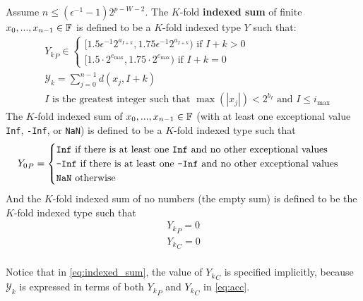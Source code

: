       \begin{samepage}
      \begin{definition}
      Assume $n \leq (\epsilon^{-1} - 1)2^{p - W - 2}$. The $K$-fold \textbf{indexed sum} of finite $x_0, ..., x_{n - 1} \in \mathbb{F}$ is defined to be a $K$-fold indexed type $Y$ such that:
      \begin{equation}
      \begin{aligned}
        &{Y_k}_P \in \begin{cases}[1.5  \epsilon^{-1} 2^{a_{I + k}}, 1.75  \epsilon^{-1} 2^{a_{I + k}}) \text{ if } I + k > 0 \\ [1.5 \cdot 2^{e_{\max}}, 1.75 \cdot 2^{e_{\max}}) \text{ if } I + k = 0\end{cases}\\
        &\mathcal{Y}_k = \sum\limits_{j = 0}^{n - 1}d(x_j, I + k)\\
        & I\text{ is the greatest integer such that }\max(|x_j|) < 2^{b_I} \text{ and } I \leq i_{\max}
      \end{aligned}
      \label{eq:indexed_sum}
      \end{equation}
      The $K$-fold indexed sum of $x_0, ..., x_{n - 1} \in \mathbb{F}$ (with at least one exceptional value \texttt{Inf}, \texttt{-Inf}, or \texttt{NaN}) is defined to be a $K$-fold indexed type such that
      \begin{equation}
        {Y_0}_P = \begin{cases}\texttt{Inf} \text{ if there is at least one \texttt{Inf} and no other exceptional values}\\ \texttt{-Inf} \text{ if there is at least one \texttt{-Inf} and no other exceptional values}\\ \texttt{NaN}\text{ otherwise}\end{cases} \label{eq:indexed_sum_exceptional}
      \end{equation}
      And the $K$-fold indexed sum of no numbers (the empty sum) is defined to be the $K$-fold indexed type such that
      \begin{align}
        {Y_k}_P = 0\nonumber\\
        {Y_k}_C = 0\nonumber\\
        \label{eq:indexed_sum_zero}
      \end{align}
      \end{definition}
      \end{samepage}

      Notice that in \eqref{eq:indexed_sum}, the value of ${Y_k}_C$ is specified implicitly, because $\mathcal{Y}_k$ is expressed in terms of both ${Y_k}_P$ and ${Y_k}_C$ in \eqref{eq:acc}.

